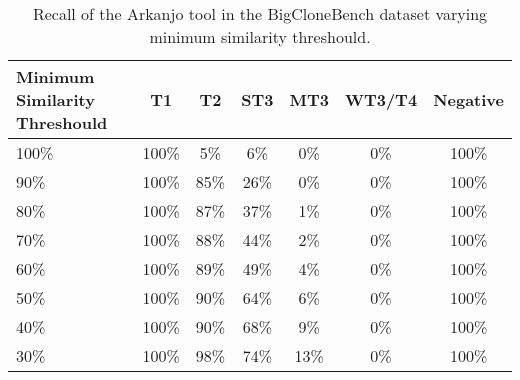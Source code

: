 \begin{table}
\begin{tabular}{ | m{6em} | c | c | c | c | c | c | }

\hline

\textbf{Minimum Similarity Threshould} & \textbf{T1} & \textbf{T2} & \textbf{ST3} & \textbf{MT3}
& \textbf{WT3/T4} & \textbf{Negative} \\ \hline 

100\% & 100\% & 5\% & 6\% & 0\% & 0\% & 100\% \\ \hline
90\% & 100\% & 85\% & 26\% & 0\% & 0\% & 100\% \\ \hline
80\% & 100\% & 87\% & 37\% & 1\% & 0\% & 100\% \\ \hline
70\% & 100\% & 88\% & 44\% & 2\% & 0\% & 100\% \\ \hline
60\% & 100\% & 89\% & 49\% & 4\% & 0\% & 100\% \\ \hline
50\% & 100\% & 90\% & 64\% & 6\% & 0\% & 100\% \\ \hline
40\% & 100\% & 90\% & 68\% & 9\% & 0\% & 100\% \\ \hline
30\% & 100\% & 98\% & 74\% & 13\% & 0\% & 100\% \\ \hline

\hline
\end{tabular}
\caption{Recall of the Arkanjo tool in the BigCloneBench dataset varying minimum similarity threshould.}
\label{tab:bigclone}
\end{table}
